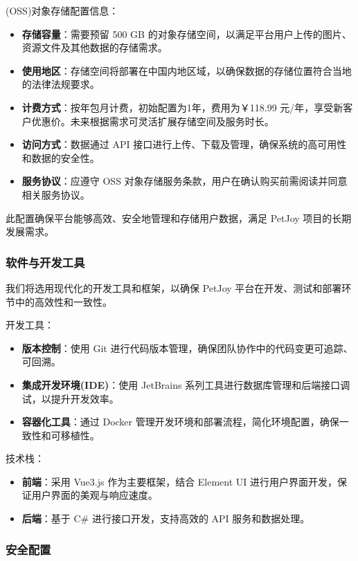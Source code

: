 (OSS)对象存储配置信息：
\begin{itemize}
\item \textbf{存储容量}：需要预留 500 GB 的对象存储空间，以满足平台用户上传的图片、资源文件及其他数据的存储需求。
\item \textbf{使用地区}：存储空间将部署在中国内地区域，以确保数据的存储位置符合当地的法律法规要求。
\item \textbf{计费方式}：按年包月计费，初始配置为1年，费用为￥118.99 元/年，享受新客户优惠价。未来根据需求可灵活扩展存储空间及服务时长。
\item \textbf{访问方式}：数据通过 API 接口进行上传、下载及管理，确保系统的高可用性和数据的安全性。
\item \textbf{服务协议}：应遵守 OSS 对象存储服务条款，用户在确认购买前需阅读并同意相关服务协议。
\end{itemize}

此配置确保平台能够高效、安全地管理和存储用户数据，满足 PetJoy 项目的长期发展需求。

\subsubsection{软件与开发工具}

我们将选用现代化的开发工具和框架，以确保 PetJoy 平台在开发、测试和部署环节中的高效性和一致性。

开发工具：
\begin{itemize}
  \item \textbf{版本控制}：使用 Git 进行代码版本管理，确保团队协作中的代码变更可追踪、可回溯。
  \item \textbf{集成开发环境(IDE)}：使用 JetBrains 系列工具进行数据库管理和后端接口调试，以提升开发效率。
  \item \textbf{容器化工具}：通过 Docker 管理开发环境和部署流程，简化环境配置，确保一致性和可移植性。
\end{itemize}

技术栈：
\begin{itemize}
  \item \textbf{前端}：采用 Vue3.js 作为主要框架，结合 Element UI 进行用户界面开发，保证用户界面的美观与响应速度。
  \item \textbf{后端}：基于 C\# 进行接口开发，支持高效的 API 服务和数据处理。
\end{itemize}

\subsubsection{安全配置}

